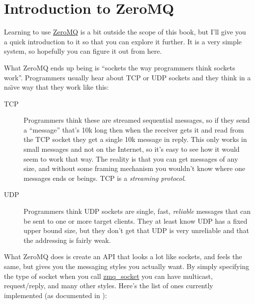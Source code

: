 \section{Introduction to ZeroMQ}

Learning to use \href{http://zeromq.org}{ZeroMQ} is a bit outside the scope of this book, but I'll give you
a quick introduction to it so that you can explore it further.  It is a very simple
system, so hopefully you can figure it out from here.

What ZeroMQ ends up being is ``sockets the way programmers think sockets work''.  Programmers
usually hear about TCP or UDP sockets and they think in a na{\"\i}ve way that they work like
this:

\begin{description}
\item [TCP] Programmers think these are streamed sequential messages, so if
   they send a ``message'' that's 10k long then when the receiver gets it and read
   from the TCP socket they get a single 10k message in reply.  This only works in
   small messages and not on the Internet, so it's easy to see how it would seem
   to work that way.  The reality is that you can get messages of any size, and without
   some framing mechanism you wouldn't know where one messages ends or beings.
   TCP is a \emph{streaming protocol}.

\item [UDP] Programmers think UDP sockets are single, fast, \emph{reliable} messages
    that can be sent to one or more target clients.  They at least know UDP has a fixed
    upper bound size, but they don't get that UDP is very unreliable and that the addressing
    is fairly weak.
\end{description}

What ZeroMQ does is create an API that looks a lot like sockets, and feels the
same, but gives you the messaging styles you actually want.  By simply
specifying the type of socket when you call
\href{http://api.zeromq.org/zmq\_socket.html}{zmq\_socket} you can have
multicast, request/reply, and many other styles.  Here's the list of ones
currently implemented (as documented in ):

